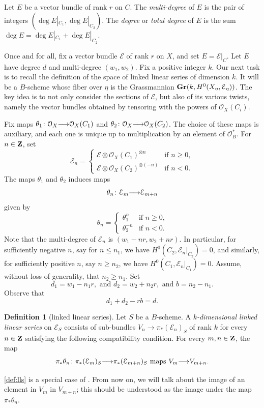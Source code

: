 \documentclass[11pt,reqno]{amsart}
\theoremstyle{plain}
\theoremstyle{definition}
\newtheorem{definition}[theorem]{Definition}
\theoremstyle{remark}
\numberwithin{equation}{section}
\renewcommand{\to}{{\longrightarrow}}
\numberwithin{equation}{section}
\renewcommand{\O}{\mathcal O}
\begin{document}
Let $E$ be a vector bundle of rank $r$ on $C$.
The \emph{multi-degree} of $E$ is the pair of integers $(\deg E|_{C_1}, \deg E|_{C_2})$.
The \emph{degree} or \emph{total degree} of $E$ is the sum $\deg E = \deg E|_{C_1} + \deg E|_{C_2}$.

Once and for all, fix a vector bundle $\mathcal E$ of rank $r$ on $X$, and set $E = \mathcal E|_C$.
Let $E$ have degree $d$ and multi-degree $(w_1, w_2)$.
Fix a positive integer $k$.
Our next task is to recall the definition of the space of linked linear series of dimension $k$.
It will be a $B$-scheme whose fiber over $\eta$ is the Grassmannian ${\bf Gr}(k, H^0(X_\eta, \mathcal E_\eta))$.
The key idea is to not only consider the sections of $\mathcal E$, but also of its various twists, namely the vector bundles obtained by tensoring with the powers of $\O_X(C_i)$.

Fix maps $\theta_1 \from \O_X \to \O_X(C_1)$ and $\theta_2 \from \O_X \to \O_X(C_2)$.
The choice of these maps is auxiliary, and each one is unique up to multiplication by an element of $\O_B^*$.
For $n \in {\bf Z}$, set
\[ \mathcal E_n =
  \begin{cases}
    \mathcal E \otimes \O_X(C_1)^{\otimes n} & \text{if $n \geq 0$},\\
    \mathcal E \otimes \O_X(C_2)^{\otimes (-n)}  & \text{if $n < 0$}.
  \end{cases}
\]
The maps $\theta_1$ and $\theta_2$ induces maps
\[ \theta_n \from \mathcal E_m \to \mathcal E_{m+n}\]
given by
\[
  \theta_n = 
  \begin{cases}
    \theta_1^n & \text{if $n \geq 0$,} \\
    \theta_2^{-n} & \text{if $n < 0$.}
  \end{cases}
\]
Note that the multi-degree of $\mathcal E_n$ is $(w_1 - nr, w_2 + nr)$.
In particular, for sufficiently negative $n$, say for $n \leq n_1$, we have $H^0(C_2, \mathcal E_n|_{C_2}) = 0$, and similarly, for sufficiently positive $n$, say $n \geq n_2$, we have $H^0(C_1, \mathcal E_n|_{C_1}) = 0$.
Assume, without loss of generality, that $n_2 \geq n_1$.
Set
\[ d_1 = w_1 - n_1 r, \text{ and } d_2 = w_2 + n_2 r, \text{ and } b = n_2 - n_1.\]
Observe that
\[ d_1 + d_2 - rb = d.\]

\begin{definition}[linked linear series]
  \label{def:lls}
  Let $S$ be a $B$-scheme.
  A \emph{$k$-dimensional linked linear series} on $\mathcal E_S$ consists of sub-bundles $V_n \to \pi_* (\mathcal E_n)_S$ of rank $k$ for every $n \in {\bf Z}$ satisfying the following compatibility condition.
  For every $m, n \in {\bf Z}$, the map
  \begin{equation}\label{lls:compatibility}
    \pi_* \theta_n \from \pi_* (\mathcal E_m)_S \to \pi_* (\mathcal E_{m+n})_S \text{ maps } V_m \to V_{m+n}.
  \end{equation}
\end{definition}
\autoref{def:lls} is a special case of \cite[Definition~3.3.2]{oss:14}.
From now on, we will talk about the image of an element in $V_m$ in $V_{m+n}$; this should be understood as the image under the map $\pi_* \theta_n$.
\end{document}
